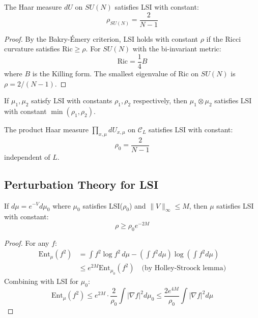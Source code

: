 \begin{theorem}\label{thm:haar-lsi}
The Haar measure $dU$ on $SU(N)$ satisfies LSI with constant:
\begin{equation}
    \rho_{SU(N)} = \frac{2}{N-1}
\end{equation}
\end{theorem}

\begin{proof}
By the Bakry-\'Emery criterion, LSI holds with constant $\rho$ if the Ricci curvature satisfies $\text{Ric} \geq \rho$. For $SU(N)$ with the bi-invariant metric:
\begin{equation}
    \text{Ric} = \frac{1}{4} B
\end{equation}
where $B$ is the Killing form. The smallest eigenvalue of Ric on $SU(N)$ is $\rho = 2/(N-1)$.
\end{proof}

\begin{theorem}\label{thm:tensor-lsi}
If $\mu_1, \mu_2$ satisfy LSI with constants $\rho_1, \rho_2$ respectively, then $\mu_1 \otimes \mu_2$ satisfies LSI with constant $\min(\rho_1, \rho_2)$.
\end{theorem}

\begin{corollary}[Lattice LSI at $\beta = 0$]
The product Haar measure $\prod_{x,\mu} dU_{x,\mu}$ on $\mathcal{C}_L$ satisfies LSI with constant:
\begin{equation}
    \rho_0 = \frac{2}{N-1}
\end{equation}
independent of $L$.
\end{corollary}

\subsection{Perturbation Theory for LSI}

\begin{theorem}\label{thm:holley-stroock}
If $d\mu = e^{-V} d\mu_0$ where $\mu_0$ satisfies LSI($\rho_0$) and $\|V\|_\infty \leq M$, then $\mu$ satisfies LSI with constant:
\begin{equation}
    \rho \geq \rho_0 e^{-2M}
\end{equation}
\end{theorem}

\begin{proof}
For any $f$:
\begin{align}
    \text{Ent}_\mu(f^2) &= \int f^2 \log f^2 \, d\mu - \left(\int f^2 d\mu\right) \log\left(\int f^2 d\mu\right) \\
    &\leq e^{2M} \text{Ent}_{\mu_0}(f^2) \quad \text{(by Holley-Stroock lemma)}
\end{align}
Combining with LSI for $\mu_0$:
\begin{equation}
    \text{Ent}_\mu(f^2) \leq e^{2M} \cdot \frac{2}{\rho_0} \int |\nabla f|^2 d\mu_0 \leq \frac{2e^{4M}}{\rho_0} \int |\nabla f|^2 d\mu
\end{equation}
\end{proof}


